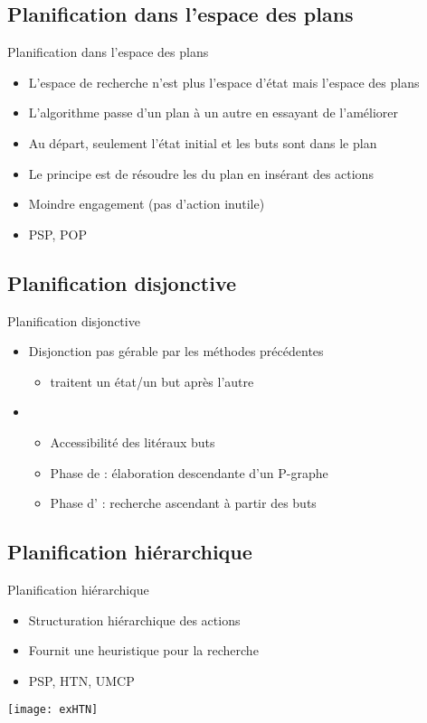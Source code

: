\documentclass[compress]{beamer}
\begin{document}
\subsection{Planification dans l'espace des plans}
\begin{frame}{Planification dans l'espace des plans}
\begin{itemize}
\item L'espace de recherche n'est plus l'espace d'état mais l'espace des plans
\item L'algorithme passe d'un plan à un autre en essayant de l'améliorer
\item Au départ, seulement l'état initial et les buts sont dans le plan
\item Le principe est de résoudre les  du plan en insérant des actions
\item Moindre engagement (pas d'action inutile)
\item PSP, POP
\end{itemize}
\end{frame}

\subsection{Planification disjonctive}
\begin{frame}{Planification disjonctive}
\begin{itemize}
\item Disjonction pas gérable par les méthodes précédentes
	\begin{itemize}
	\item traitent un état/un but après l'autre
	\end{itemize}
\item {}
	\begin{itemize}
	\item Accessibilité des litéraux buts
	\item Phase de  : élaboration descendante d'un P-graphe
	\item Phase d' : recherche ascendant à partir des buts
	\end{itemize}
\end{itemize}
\end{frame}

\subsection{Planification hiérarchique}
\begin{frame}{Planification hiérarchique}
\begin{itemize}
\item Structuration hiérarchique des actions
\item Fournit une heuristique pour la recherche
\item PSP, HTN, UMCP
\end{itemize}
\begin{center}
\texttt{[image: exHTN]}
\end{center}
\end{frame}
\end{document}
